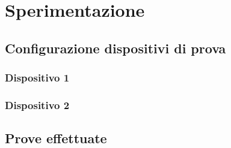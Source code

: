 \documentclass[../Sperimentazione.tex]{subfiles}
\begin{document}
\section{Sperimentazione}

	\subsection{Configurazione dispositivi di prova}
	
		\subsubsection{Dispositivo 1}
			
		
		\subsubsection{Dispositivo 2}
	
	\newpage
	\subsection{Prove effettuate}
			
\end{document}
